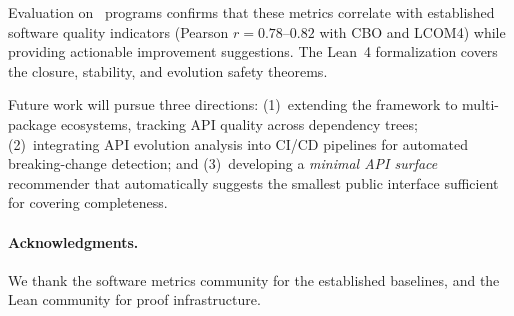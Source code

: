 \documentclass[11pt]{article}
\begin{document}
Evaluation on \compTotalPrograms\ programs confirms that these
metrics correlate with established software quality indicators (Pearson
$r = 0.78$--$0.82$ with CBO and LCOM4) while providing actionable
improvement suggestions.  The Lean~4 formalization covers the closure,
stability, and evolution safety theorems.

Future work will pursue three directions: (1)~extending the framework to
multi-package ecosystems, tracking API quality across dependency trees;
(2)~integrating API evolution analysis into CI/CD pipelines for automated
breaking-change detection; and (3)~developing a \emph{minimal API surface}
recommender that automatically suggests the smallest public interface
sufficient for covering completeness.

\paragraph{Acknowledgments.}
We thank the software metrics community for the established baselines, and
the Lean community for proof infrastructure.
\end{document}
